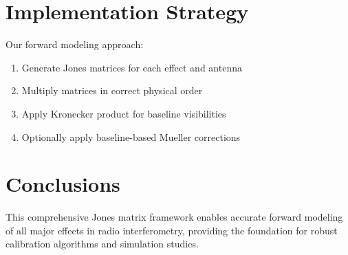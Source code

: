 \documentclass{aastex631}
\begin{document}
\section{Implementation Strategy}

Our forward modeling approach:
\begin{enumerate}
\item Generate Jones matrices for each effect and antenna
\item Multiply matrices in correct physical order
\item Apply Kronecker product for baseline visibilities
\item Optionally apply baseline-based Mueller corrections
\end{enumerate}

\section{Conclusions}

This comprehensive Jones matrix framework enables accurate forward modeling of all major effects in radio interferometry, providing the foundation for robust calibration algorithms and simulation studies.
\end{document}
